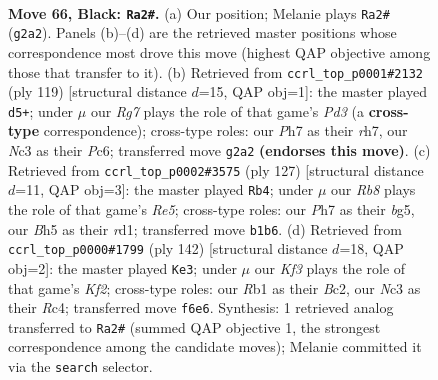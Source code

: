 \documentclass[11pt]{article}
\begin{document}
\clearpage

\begin{figure}[p]\centering
\begin{subfigure}{0.46\textwidth}\centering
\resizebox{\linewidth}{!}{%
\newchessgame
\chessboard[
  setfen={8/7p/5k2/4p2b/8/K1n5/6r1/1r6 b - - 6 66},
  showmover=false,
  pgfstyle=straightmove, color=movearrow, markmove={g2-a2}
]}
\caption{}
\end{subfigure}\hfill
\begin{subfigure}{0.46\textwidth}\centering
\resizebox{\linewidth}{!}{%
\newchessgame
\chessboard[
  setfen={8/7R/2pp1P2/8/2k1K3/1r6/8/8 b - - 0 60},
  showmover=false,
  pgfstyle=straightmove, color=movearrow, markmove={d6-d5}
]}
\caption{}
\end{subfigure}
\\[4pt]
\begin{subfigure}{0.46\textwidth}\centering
\resizebox{\linewidth}{!}{%
\newchessgame
\chessboard[
  setfen={6k1/6p1/8/2n3B1/4r3/7K/8/3R4 b - - 13 64},
  showmover=false,
  pgfstyle=straightmove, color=movearrow, markmove={e4-b4}
]}
\caption{}
\end{subfigure}\hfill
\begin{subfigure}{0.46\textwidth}\centering
\resizebox{\linewidth}{!}{%
\newchessgame
\chessboard[
  setfen={r7/5k2/3b4/8/2R5/5P2/2B2K2/8 w - - 9 72},
  showmover=false,
  pgfstyle=straightmove, color=movearrow, markmove={f2-e3}
]}
\caption{}
\end{subfigure}
\caption{\textbf{Move 66, Black: \texttt{Ra2\#}.} (a) Our position; Melanie plays \texttt{Ra2\#} (\texttt{g2a2}). Panels (b)--(d) are the retrieved master positions whose correspondence most drove this move (highest QAP objective among those that transfer to it). (b) Retrieved from \texttt{ccrl\_top\_p0001\#2132} (ply 119) [structural distance $d$=15, QAP obj=1]: the master played \texttt{d5+}; under $\mu$ our \emph{Rg7} plays the role of that game's \emph{Pd3} (a \textbf{cross-type} correspondence); cross-type roles: our \emph{P}h7 as their \emph{r}h7, our \emph{N}c3 as their \emph{P}c6; transferred move \texttt{g2a2} \textbf{(endorses this move)}. (c) Retrieved from \texttt{ccrl\_top\_p0002\#3575} (ply 127) [structural distance $d$=11, QAP obj=3]: the master played \texttt{Rb4}; under $\mu$ our \emph{Rb8} plays the role of that game's \emph{Re5}; cross-type roles: our \emph{P}h7 as their \emph{b}g5, our \emph{B}h5 as their \emph{r}d1; transferred move \texttt{b1b6}. (d) Retrieved from \texttt{ccrl\_top\_p0000\#1799} (ply 142) [structural distance $d$=18, QAP obj=2]: the master played \texttt{Ke3}; under $\mu$ our \emph{Kf3} plays the role of that game's \emph{Kf2}; cross-type roles: our \emph{R}b1 as their \emph{B}c2, our \emph{N}c3 as their \emph{R}c4; transferred move \texttt{f6e6}. Synthesis: 1 retrieved analog transferred to \texttt{Ra2\#} (summed QAP objective 1, the strongest correspondence among the candidate moves); Melanie committed it via the \texttt{search} selector.}
\label{fig:thought-m131}
\end{figure}
\end{document}
